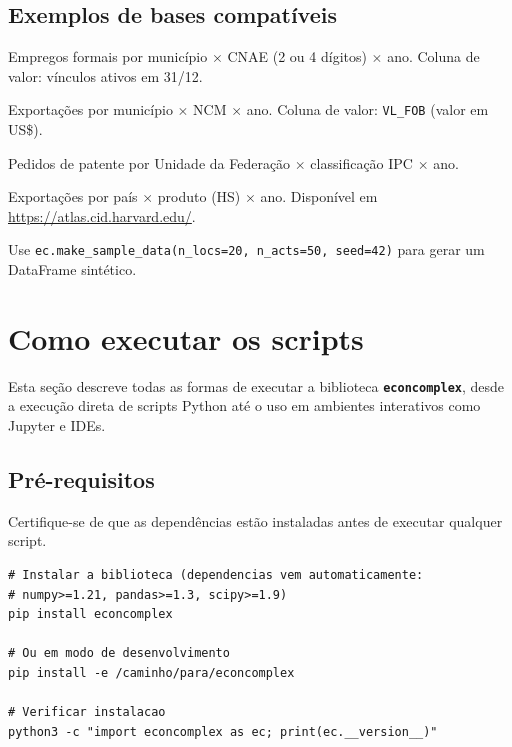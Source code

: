 \documentclass[12pt, a4paper]{article}
\newcommand{\pkg}[1]{\texttt{\textbf{#1}}}
\newcommand{\fn}[1]{\texttt{#1}}
\begin{document}
\subsection{Exemplos de bases compat\'{i}veis}

\begin{description}[leftmargin=1.5em, style=nextline]
  \item[\textbf{RAIS/MTE}]
    Empregos formais por munic\'{i}pio $\times$ CNAE (2 ou 4 d\'{i}gitos)
    $\times$ ano. Coluna de valor: v\'{i}nculos ativos em 31/12.
  \item[\textbf{COMEX/MDIC}]
    Exporta\c{c}\~{o}es por munic\'{i}pio $\times$ NCM $\times$ ano.
    Coluna de valor: \texttt{VL\_FOB} (valor em US\$).
  \item[\textbf{INPI --- Patentes}]
    Pedidos de patente por Unidade da Federa\c{c}\~{a}o $\times$
    classifica\c{c}\~{a}o IPC $\times$ ano.
  \item[\textbf{Atlas da Complexidade (Harvard)}]
    Exporta\c{c}\~{o}es por pa\'{i}s $\times$ produto (HS) $\times$ ano.
    Dispon\'{i}vel em \url{https://atlas.cid.harvard.edu/}.
  \item[\textbf{Dados simulados (testes)}]
    Use \fn{ec.make\_sample\_data(n\_locs=20, n\_acts=50, seed=42)}
    para gerar um DataFrame sint\'{e}tico.
\end{description}

\section{Como executar os scripts}

Esta se\c{c}\~{a}o descreve todas as formas de executar a biblioteca
\pkg{econcomplex}, desde a execu\c{c}\~{a}o direta de scripts Python
at\'{e} o uso em ambientes interativos como Jupyter e IDEs.

\subsection{Pr\'{e}-requisitos}

\begin{warnbox}
  Certifique-se de que as depend\^{e}ncias est\~{a}o instaladas antes de
  executar qualquer script.
\end{warnbox}

\begin{lstlisting}[style=bashstyle,
  caption={Instala\c{c}\~{a}o das depend\^{e}ncias}]
# Instalar a biblioteca (dependencias vem automaticamente:
# numpy>=1.21, pandas>=1.3, scipy>=1.9)
pip install econcomplex

# Ou em modo de desenvolvimento
pip install -e /caminho/para/econcomplex

# Verificar instalacao
python3 -c "import econcomplex as ec; print(ec.__version__)"
\end{lstlisting}
\end{document}
